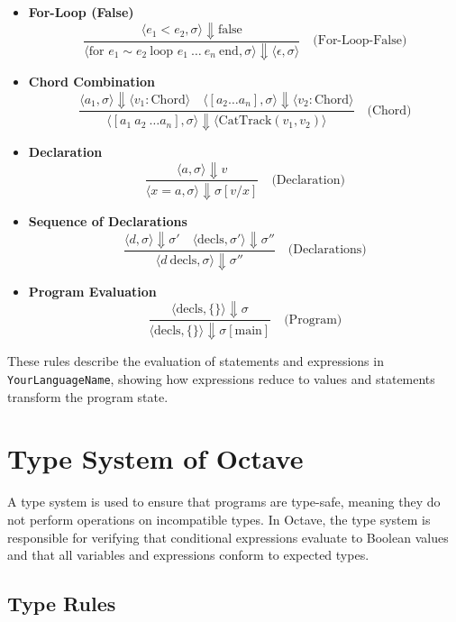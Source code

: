 \documentclass[letterpaper,12pt]{article}
\begin{document}
\begin{itemize}
    \item \textbf{For-Loop (False)}
    \[
    \frac{\langle e_1 < e_2, \sigma \rangle \Downarrow \text{false}}{\langle \text{for } e_1 \sim e_2 \ \text{loop } e_1 \ \dots \ e_n \ \text{end}, \sigma \rangle \Downarrow \langle \epsilon, \sigma \rangle} \quad \text{(For-Loop-False)}
    \]

    \item \textbf{Chord Combination}
    \[
    \frac{\langle a_1, \sigma \rangle \Downarrow \langle v_1 : \text{Chord} \rangle \quad \langle [a_2 \dots a_n], \sigma \rangle \Downarrow \langle v_2 : \text{Chord} \rangle}{\langle [a_1 \ a_2 \ \dots a_n], \sigma \rangle \Downarrow \langle \text{CatTrack}(v_1, v_2) \rangle} \quad \text{(Chord)}
    \]

    \item \textbf{Declaration}
    \[
    \frac{\langle a, \sigma \rangle \Downarrow v}{\langle x = a, \sigma \rangle \Downarrow \sigma[v/x]} \quad \text{(Declaration)}
    \]

    \item \textbf{Sequence of Declarations}
    \[
    \frac{\langle d, \sigma \rangle \Downarrow \sigma' \quad \langle \text{decls}, \sigma' \rangle \Downarrow \sigma''}{\langle d \ \text{decls}, \sigma \rangle \Downarrow \sigma''} \quad \text{(Declarations)}
    \]

    \item \textbf{Program Evaluation}
    \[
    \frac{\langle \text{decls}, \{\} \rangle \Downarrow \sigma}{\langle \text{decls}, \{\} \rangle \Downarrow \sigma[\text{main}]} \quad \text{(Program)}
    \]

\end{itemize}

These rules describe the evaluation of statements and expressions in \texttt{YourLanguageName}, showing how expressions reduce to values and statements transform the program state.

\section{Type System of Octave}

A type system is used to ensure that programs are type-safe,
 meaning they do not perform operations on incompatible types. 
 In Octave, the type system is responsible for verifying that conditional expressions evaluate to Boolean values and that all variables and expressions conform to expected types.

\subsection{Type Rules}
\end{document}
